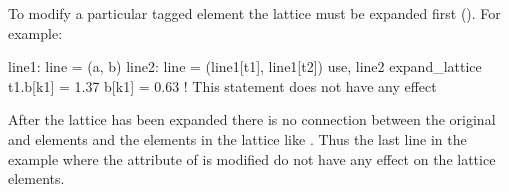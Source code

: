 To modify a particular tagged element the lattice must be expanded first (). For example:
\begin{example}
  line1: line = (a, b)
  line2: line = (line1[t1], line1[t2])
  use, line2
  expand_lattice
  t1.b[k1] = 1.37
  b[k1] = 0.63       ! This statement does not have any effect
\end{example}
After the lattice has been expanded there is no connection between 
the original  and  elements and the elements in the lattice like
. Thus the last line in the example where the  attribute of 
is modified do not have any effect on the lattice elements. 
